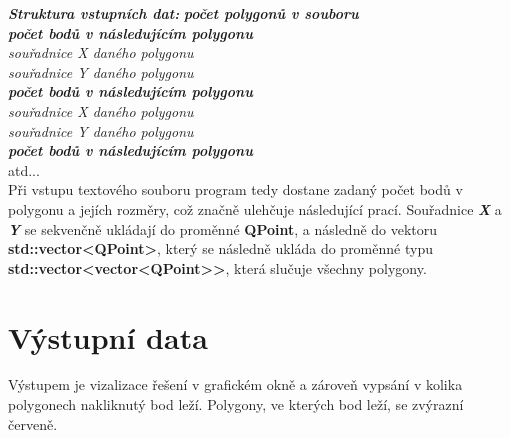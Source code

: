 \documentclass{article}
\begin{document}
 \textit{\textbf {Struktura vstupních dat:}}
\textit{\textbf {počet polygonů v souboru}}\\
\textit{\textbf {počet bodů v následujícím polygonu}}\\
\textit{souřadnice X daného polygonu}\\
\textit{souřadnice Y daného polygonu}\\
\textit{\textbf {počet bodů v následujícím polygonu}} \\
\textit{souřadnice X daného polygonu}\\
\textit{souřadnice Y daného polygonu}\\
\textit{\textbf {počet bodů v následujícím polygonu}}\\
atd...
\bigskip 
\\
Při vstupu textového souboru program tedy dostane zadaný počet bodů v polygonu a jejích rozměry, což značně ulehčuje následující prací. Souřadnice \textit{\textbf {X}} a \textit{\textbf {Y}} se sekvenčně ukládají do 
proměnné \textbf {QPoint}, a následně do vektoru  \textbf {std::vector<QPoint>}, který  se následně ukláda do proměnné typu  \textbf {std::vector<vector<QPoint>}\textbf {>}, která slučuje všechny polygony.


\section{Výstupní data}
	Výstupem je vizalizace řešení v grafickém okně a zároveň vypsání v kolika polygonech nakliknutý bod leží. Polygony, ve kterých bod leží, se zvýrazní červeně.\\ 
\bigskip 

\clearpage
\end{document}
